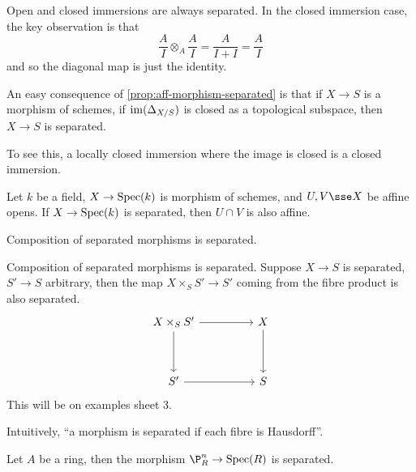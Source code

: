 \documentclass{article}
\begin{document}
\begin{example}
     Open and closed immersions are always separated. In the closed immersion case, the key observation is that
    \[\frac{A}{I} \otimes_A \frac{A}{I} = \frac{A}{I + I} = \frac{A}{I}\]
    and so the diagonal map is just the identity.
\end{example}

An easy consequence of \cref{prop:aff-morphism-separated} is that if \(X \to S\) is a morphism of schemes, if \(\operatorname{im}(\Delta_{X/S})\) is closed as a topological subspace, then \(X \to S\) is separated.

To see this, a locally closed immersion where the image is closed is a closed immersion.

\begin{proposition}
    Let \(k\) be a field, \(X \to \operatorname{Spec}(k)\) is morphism of schemes, and \(U, V \sse X\) be affine opens. If \(X \to \operatorname{Spec}(k)\) is separated, then \(U \cap V\) is also affine.
\end{proposition}

\lec

\begin{proposition}
    Composition of separated morphisms is separated. 
\end{proposition}

\begin{example}
    Composition of separated morphisms is separated. Suppose \(X \to S\) is separated, \(S' \to S\) arbitrary, then the map \(X \times_S S' \to S'\) coming from the fibre product is also separated.
    \[\begin{tikzcd}
        {X\times_S S'} && X \\
        \\
        {S'} && S
        \arrow[from=1-1, to=1-3]
        \arrow[from=1-3, to=3-3]
        \arrow[from=3-1, to=3-3]
        \arrow[from=1-1, to=3-1]
    \end{tikzcd}\]
    This will be on examples sheet 3.
\end{example}

Intuitively, ``a morphism is separated if each fibre is Hausdorff''.

\begin{proposition}
    Let \(A\) be a ring, then the morphism \(\P^n_R \to \Spec(R)\) is separated.
\end{proposition}
\end{document}
